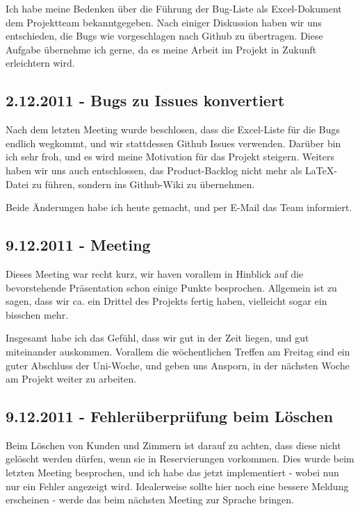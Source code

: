 \documentclass[11pt]{scrartcl}
\begin{document}
Ich habe meine Bedenken über die Führung der Bug-Liste als Excel-Dokument dem
Projektteam bekanntgegeben. Nach einiger Diskussion haben wir uns entschieden,
die Bugs wie vorgeschlagen nach Github zu übertragen. Diese Aufgabe übernehme
ich gerne, da es meine Arbeit im Projekt in Zukunft erleichtern wird.


\subsection{2.12.2011 - Bugs zu Issues konvertiert}

Nach dem letzten Meeting wurde beschlosen, dass die Excel-Liste für die Bugs
endlich wegkommt, und wir stattdessen Github Issues verwenden. Darüber bin ich
sehr froh, und es wird meine Motivation für das Projekt steigern. Weiters haben
wir uns auch entschlossen, das Product-Backlog nicht mehr als LaTeX-Datei zu
führen, sondern ins Github-Wiki zu übernehmen.

Beide Änderungen habe ich heute gemacht, und per E-Mail das Team informiert.


\subsection{9.12.2011 - Meeting}

Dieses Meeting war recht kurz, wir haven vorallem in Hinblick auf die
bevorstehende Präsentation schon einige Punkte besprochen. Allgemein ist zu
sagen, dass wir ca. ein Drittel des Projekts fertig haben, vielleicht sogar
ein bisschen mehr.

Insgesamt habe ich das Gefühl, dass wir gut in der Zeit liegen, und gut
miteinander auskommen. Vorallem die wöchentlichen Treffen am Freitag sind ein
guter Abschluss der Uni-Woche, und geben uns Ansporn, in der nächsten Woche
am Projekt weiter zu arbeiten.


\subsection{9.12.2011 - Fehlerüberprüfung beim Löschen}

Beim Löschen von Kunden und Zimmern ist darauf zu achten, dass diese nicht
gelöscht werden dürfen, wenn sie in Reservierungen vorkommen. Dies wurde beim
letzten Meeting besprochen, und ich habe das jetzt implementiert - wobei nun
nur ein Fehler angezeigt wird. Idealerweise sollte hier noch eine bessere
Meldung erscheinen - werde das beim nächsten Meeting zur Sprache bringen.
\end{document}
